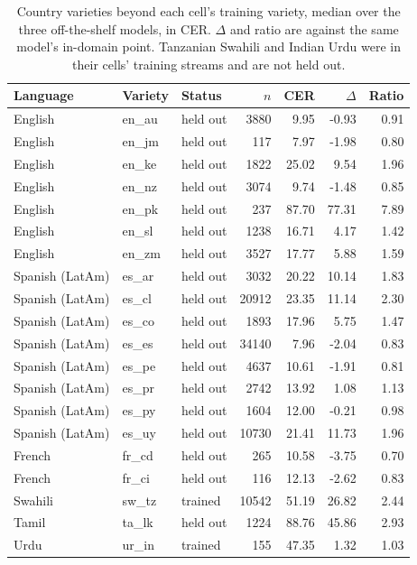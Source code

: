 \begin{table}[t]
\centering
\setlength{\tabcolsep}{4pt}
\begin{tabular}{@{}lllrrrr@{}}
\toprule
\textbf{Language} & \textbf{Variety} & \textbf{Status} & \textbf{$n$} & \textbf{CER} & \textbf{$\Delta$} & \textbf{Ratio} \\
\midrule
English & en\_au & held out & 3880 & 9.95 & -0.93 & 0.91 \\
English & en\_jm & held out & 117 & 7.97 & -1.98 & 0.80 \\
English & en\_ke & held out & 1822 & 25.02 & 9.54 & 1.96 \\
English & en\_nz & held out & 3074 & 9.74 & -1.48 & 0.85 \\
English & en\_pk & held out & 237 & 87.70 & 77.31 & 7.89 \\
English & en\_sl & held out & 1238 & 16.71 & 4.17 & 1.42 \\
English & en\_zm & held out & 3527 & 17.77 & 5.88 & 1.59 \\
Spanish (LatAm) & es\_ar & held out & 3032 & 20.22 & 10.14 & 1.83 \\
Spanish (LatAm) & es\_cl & held out & 20912 & 23.35 & 11.14 & 2.30 \\
Spanish (LatAm) & es\_co & held out & 1893 & 17.96 & 5.75 & 1.47 \\
Spanish (LatAm) & es\_es & held out & 34140 & 7.96 & -2.04 & 0.83 \\
Spanish (LatAm) & es\_pe & held out & 4637 & 10.61 & -1.91 & 0.81 \\
Spanish (LatAm) & es\_pr & held out & 2742 & 13.92 & 1.08 & 1.13 \\
Spanish (LatAm) & es\_py & held out & 1604 & 12.00 & -0.21 & 0.98 \\
Spanish (LatAm) & es\_uy & held out & 10730 & 21.41 & 11.73 & 1.96 \\
French & fr\_cd & held out & 265 & 10.58 & -3.75 & 0.70 \\
French & fr\_ci & held out & 116 & 12.13 & -2.62 & 0.83 \\
Swahili & sw\_tz & trained & 10542 & 51.19 & 26.82 & 2.44 \\
Tamil & ta\_lk & held out & 1224 & 88.76 & 45.86 & 2.93 \\
Urdu & ur\_in & trained & 155 & 47.35 & 1.32 & 1.03 \\
\bottomrule
\end{tabular}
\caption{Country varieties beyond each cell's training variety, median over the three off-the-shelf models, in CER. $\Delta$ and ratio are against the same model's in-domain point. Tanzanian Swahili and Indian Urdu were in their cells' training streams and are not held out.}
\label{tab:accent}
\end{table}
